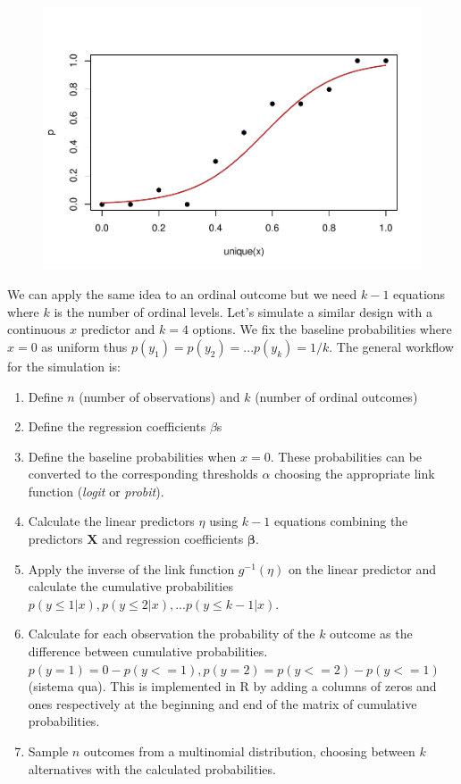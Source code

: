 \documentclass[
  man,floatsintext]{apa6}
\providecommand{\tightlist}{%
  \setlength{\itemsep}{0pt}\setlength{\parskip}{0pt}}
\begin{document}
\begin{figure}

{\centering \includegraphics{paper-new_files/figure-latex/unnamed-chunk-9-1} 

}

\caption{ }\label{fig:unnamed-chunk-9}
\end{figure}

We can apply the same idea to an ordinal outcome but we need \(k - 1\) equations where \(k\) is the number of ordinal levels. Let's simulate a similar design with a continuous \(x\) predictor and \(k = 4\) options. We fix the baseline probabilities where \(x = 0\) as uniform thus \(p(y_1) = p(y_2) = ... p(y_k) = 1/k\). The general workflow for the simulation is:

\begin{enumerate}
\def\labelenumi{\arabic{enumi}.}
\tightlist
\item
  Define \(n\) (number of observations) and \(k\) (number of ordinal outcomes)
\item
  Define the regression coefficients \(\beta\)s
\item
  Define the baseline probabilities when \(x = 0\). These probabilities can be converted to the corresponding thresholds \(\alpha\) choosing the appropriate link function (\emph{logit} or \emph{probit}).
\item
  Calculate the linear predictors \(\eta\) using \(k - 1\) equations combining the predictors \(\mathbf{X}\) and regression coefficients \(\mathbf{\beta}\).
\item
  Apply the inverse of the link function \(g^{-1}(\eta)\) on the linear predictor and calculate the cumulative probabilities \(p(y \leq 1|x), p(y \leq 2|x), ... p(y \leq k - 1|x)\).
\item
  Calculate for each observation the probability of the \(k\) outcome as the difference between cumulative probabilities. \(p(y = 1) = 0 - p(y <= 1), p(y = 2) = p(y <= 2) - p(y <= 1)\) (sistema qua). This is implemented in R by adding a columns of zeros and ones respectively at the beginning and end of the matrix of cumulative probabilities.
\item
  Sample \(n\) outcomes from a multinomial distribution, choosing between \(k\) alternatives with the calculated probabilities.
\end{enumerate}
\end{document}
